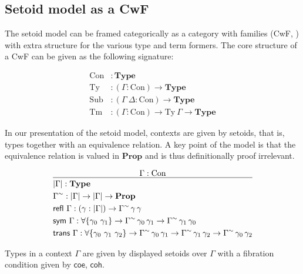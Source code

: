 \documentclass{easychair}
\newcommand{\GG}{\Gamma}
\newcommand{\GD}{\Delta}
\newcommand{\mType}{\mathbf{Type}}
\newcommand{\mProp}{\mathbf{Prop}}
\newcommand{\Con}{\mathrm{Con}}
\newcommand{\Ty}{\mathrm{Ty}}
\newcommand{\Tm}{\mathrm{Tm}}
\newcommand{\Sub}{\mathrm{Sub}}
\begin{document}
\subsection{Setoid model as a CwF}

The setoid model can be framed categorically as a category with families (CwF,
\cite{internal-tt}) with extra structure for the various type and term
formers. The core structure of a CwF can be given as the following signature:

\begin{align*}
  \Con &: \mType \\
  \Ty &: (\GG : \Con) \to \mType \\
  \Sub &: (\GG\ \GD : \Con) \to \mType \\
  \Tm &: (\GG : \Con) \to \Ty\ \GG \to \mType
\end{align*}

In our presentation of the setoid model, contexts are given by setoids, that is,
types together with an equivalence relation. A key point of the model is that the
equivalence relation is valued in $\mProp$ and is thus definitionally proof
irrelevant.

\[
\infer{
  \begin{aligned}
    & | \GG | : \mType \\
    & \GG^\sim : | \GG | \to | \GG | \to \mProp \\
    & \textsf{refl}\ \GG : (\gamma : | \GG |) \to \GG^\sim\,\gamma\,\gamma \\
    & \textsf{sym} \ \GG : \forall\{\gamma_0\ \gamma_1\} \to \GG^\sim\,\gamma_0\,\gamma_1
    \to \GG^\sim\,\gamma_1\,\gamma_0 \\
    & \textsf{trans} \ \GG : \forall\{\gamma_0\ \gamma_1\ \gamma_2\}
    \to \GG^\sim\,\gamma_0\,\gamma_1
    \to \GG^\sim\,\gamma_1\,\gamma_2
    \to \GG^\sim\,\gamma_0\,\gamma_2
  \end{aligned}
}{
  \GG : \Con
}
\]

Types in a context $\GG$ are given by displayed setoids over $\GG$
with a fibration condition given by $\textsf{coe}$, $\textsf{coh}$.
\end{document}
